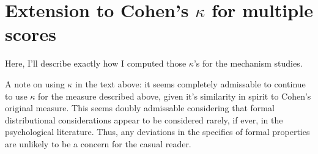 \graphicspath{{appendices/kappa-extension/}}

\chapter{Extension to Cohen's \texorpdfstring{$\kappa$}{kappa} for multiple scores}
\label{app:kappa}

Here, I'll describe exactly how I computed those $\kappa$'s for the mechanism
studies.

A note on using $\kappa$ in the text above: it seems completely admissable to
continue to use $\kappa$ for the measure described above, given it's similarity
in spirit to Cohen's original measure. This seems doubly admissable considering
that formal distributional considerations appear to be considered rarely, if
ever, in the psychological literature. Thus, any deviations in the specifics of
formal properties are unlikely to be a concern for the casual reader.
